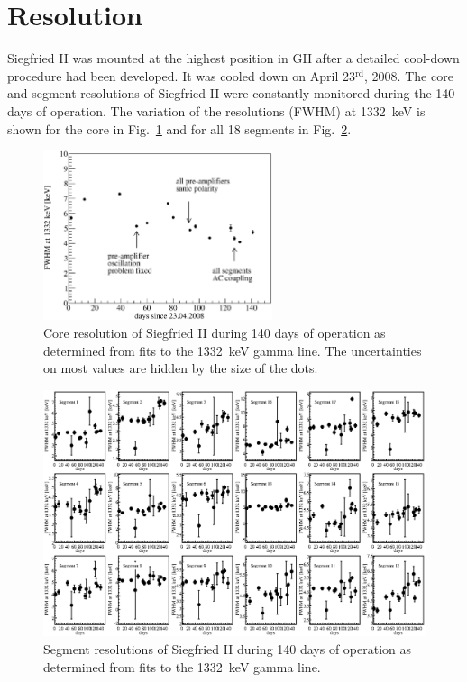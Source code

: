 \section{Resolution}
\label{sec:ii:sigma}
Siegfried II was mounted at the highest position in GII after a detailed cool-down procedure had been developed. It was cooled down on April 23$^{\text{rd}}$, 2008. The core and segment resolutions of Siegfried II were constantly monitored during the 140 days of operation. The variation of the resolutions (FWHM) at 1332~keV is shown for the core in Fig.~\ref{fig:ii:fwhm_core} and for all 18 segments in Fig.~\ref{fig:ii:fwhm_segs}.
\begin{figure}[hbtp]
\centering
\includegraphics[width=0.6\textwidth]{fwhm_versus_time_core}
\caption{Core resolution of Siegfried II during 140 days of operation as determined from fits to the 1332~keV gamma line. The uncertainties on most values are hidden by the size of the dots.}
\label{fig:ii:fwhm_core}
\end{figure}

\begin{figure}
\centering
\includegraphics{fwhm_versus_time_segments}
\caption{Segment resolutions of Siegfried II during 140 days of operation as determined from fits to the 1332~keV gamma line.}
\label{fig:ii:fwhm_segs}
\end{figure}

